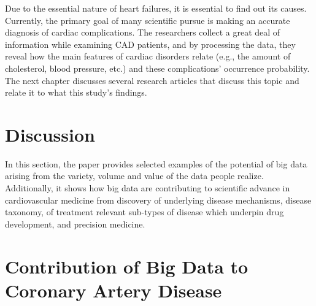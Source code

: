 \documentclass[sigconf]{acmart}
\begin{document}
Due to the essential nature of heart failures, it is essential to find out its causes. Currently, the primary goal of many scientific pursue is making an accurate diagnosis of cardiac complications. The researchers collect a great deal of information while examining CAD patients, and by processing the data, they reveal how the main features of cardiac disorders relate (e.g., the amount of cholesterol, blood pressure, etc.) and these complications' occurrence probability. The next chapter discusses several research articles that discuss this topic and relate it to what this study's findings.

\section{Discussion}
In this section, the paper provides selected examples of the potential of big data arising from the variety, volume and value of the data people realize. Additionally, it shows how big data are contributing to scientific advance in cardiovascular medicine from discovery of underlying disease mechanisms, disease taxonomy, of treatment relevant sub-types of disease which underpin drug development, and precision medicine.

\section{Contribution of Big Data to Coronary Artery Disease}
\end{document}
